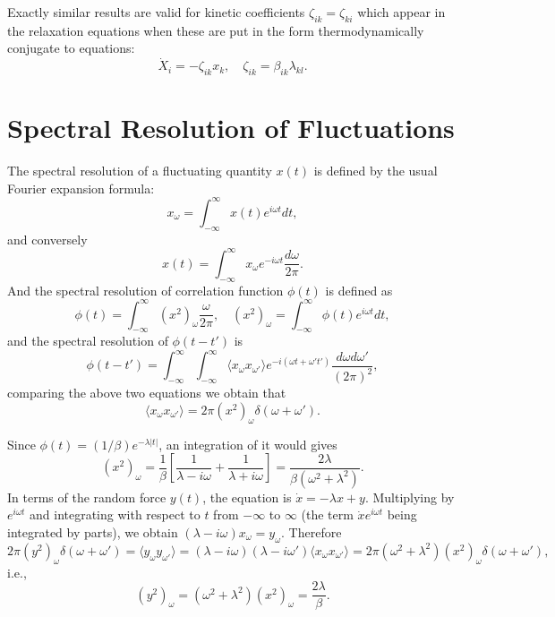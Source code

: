 \documentclass{book}
\newcommand{\average}[1]{\langle#1\rangle}
\numberwithin{equation}{section}
\begin{document}
Exactly similar results are valid for kinetic coefficients
$\zeta_{ik}=\zeta_{ki}$ which appear in the relaxation equations when these are
put in the form thermodynamically conjugate to equations:
\begin{equation}
  \dot{X}_i=-\zeta_{ik}x_k,\quad \zeta_{ik}=\beta_{ik}\lambda_{kl}.
\end{equation}

\section{Spectral Resolution of Fluctuations}
The spectral resolution of a fluctuating quantity $x(t)$ is defined by
the usual Fourier expansion formula:
\begin{equation}
  x_\omega=\int_{-\infty}^{\infty} x(t)e^{i\omega t}dt,
\end{equation}
and conversely 
\begin{equation}
  x(t)=\int_{-\infty}^{\infty}x_\omega e^{-i\omega t}\frac{d\omega}{2\pi}.
\end{equation}
And the spectral resolution of correlation function $\phi(t)$ is
defined as
\begin{equation}
  \phi(t)=\int_{-\infty}^{\infty}(x^2)_\omega\frac{\omega}{2\pi},\quad
  (x^2)_\omega=\int_{-\infty}^{\infty} \phi(t)e^{i\omega t}dt,
\end{equation}
and the spectral resolution of $\phi(t-t')$ is
\begin{equation}
  \phi(t-t')=\int_{-\infty}^{\infty}\int_{-\infty}^{\infty}\average{x_{\omega}x_{\omega'}}
  e^{-i(\omega t+\omega't')}\frac{d\omega d\omega'}{(2\pi)^2},
\end{equation}
comparing the above two equations we obtain that
\begin{equation}
  \average{x_{\omega}x_{\omega'}}=2\pi(x^2)_\omega\delta(\omega+\omega').
\end{equation}

Since $\phi(t)=(1/\beta)e^{-\lambda|t|}$, an integration of it would gives
\begin{equation}
  (x^2)_\omega=\frac{1}{\beta}\left[\frac{1}{\lambda-i\omega}+
    \frac{1}{\lambda+i\omega}\right]=\frac{2\lambda}{\beta(\omega^2+\lambda^2)}.
\end{equation}
In terms of the random force $y(t)$, the equation is $\dot{x}=-\lambda
x+y$. Multiplying by $e^{i\omega t}$ and integrating with respect to
$t$ from $-\infty$ to $\infty$ (the term $\dot{x}e^{i\omega t}$ being
integrated by parts), we obtain
$(\lambda-i\omega)x_\omega=y_\omega$. Therefore
\begin{equation}
  2\pi(y^2)_\omega\delta(\omega+\omega')=\average{y_\omega y_{\omega'}}=
  (\lambda-i\omega)(\lambda-i\omega')\average{x_\omega x_{\omega'}}=
  2\pi(\omega^2+\lambda^2)(x^2)_\omega\delta(\omega+\omega'),
\end{equation}
i.e.,
\begin{equation}
  (y^2)_\omega=(\omega^2+\lambda^2)(x^2)_\omega=\frac{2\lambda}{\beta}.
\end{equation}
\end{document}
